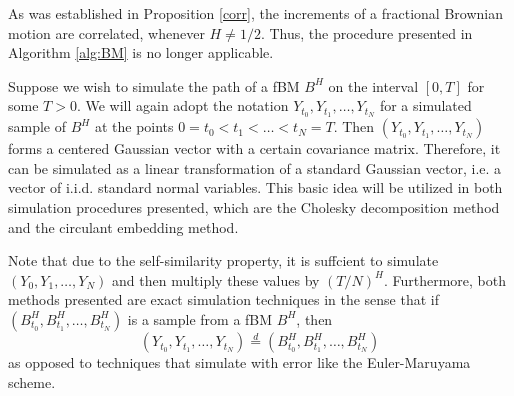 As was established in Proposition \ref{corr}, the increments of a fractional Brownian motion are correlated, whenever $H\neq 1/2$. Thus, the procedure presented in Algorithm \ref{alg:BM} is no longer applicable.

Suppose we wish to simulate the path of a fBM $B^{H}$ on the interval $[0,T]$ for some $T>0$. We will again adopt the notation $Y_{t_{0}},Y_{t_{1}},\dots,Y_{t_{N}}$ for a simulated sample of $B^{H}$ at the points $0=t_{0}<t_{1}<\dots<t_{N}=T$.
Then $(Y_{t_{0}},Y_{t_{1}},\dots,Y_{t_{N}})$ forms a centered Gaussian vector with a certain covariance matrix. Therefore, it can be simulated as a linear transformation of a standard Gaussian vector, i.e. a vector of i.i.d. standard normal variables. This basic idea will be utilized in both simulation procedures presented, which are the Cholesky decomposition method and the circulant embedding method. 

Note that due to the self-similarity property, it is suffcient to simulate $(Y_{0},Y_{1},\dots, Y_{N})$ and then multiply these values by $(T/N)^H$. Furthermore, both methods presented are exact simulation techniques in the sense that if $(B_{t_{0}}^{H},B_{t_{1}}^{H},\dots, B_{t_{N}}^{H})$ is a sample from a fBM $B^H$, then 
\begin{equation}
    (Y_{t_{0}},Y_{t_{1}},\dots,Y_{t_{N}}) \overset{d}{=}(B_{t_{0}}^{H},B_{t_{1}}^{H},\dots, B_{t_{N}}^{H})
\end{equation}
as opposed to techniques that simulate with error like the Euler-Maruyama scheme.

